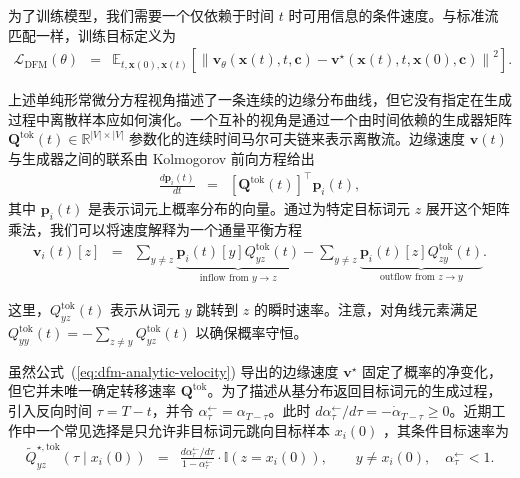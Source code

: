 为了训练模型，我们需要一个仅依赖于时间 $t$ 时可用信息的条件速度。与标准流匹配一样，训练目标定义为
\begin{eqnarray}
\mathcal{L}_{\text{DFM}}(\theta)
& = &
\mathbb{E}_{t, \mathbf{x}(0), \mathbf{x}(t)} \left[ \left\| \mathbf{v}_\theta(\mathbf{x}(t), t, \mathbf{c}) - \mathbf{v}^\star(\mathbf{x}(t), t, \mathbf{x}(0), \mathbf{c}) \right\|^2 \right].
\label{eq:dfm-objective}
\end{eqnarray}

上述单纯形常微分方程视角描述了一条连续的边缘分布曲线，但它没有指定在生成过程中离散样本应如何演化。一个互补的视角是通过一个由时间依赖的生成器矩阵 $\mathbf{Q}^{\mathrm{tok}}(t) \in \mathbb{R}^{|V| \times |V|}$ 参数化的连续时间马尔可夫链来表示离散流。边缘速度 $\mathbf{v}(t)$ 与生成器之间的联系由 Kolmogorov 前向方程给出
\begin{eqnarray}
\frac{d\mathbf{p}_i(t)}{dt} & = & \left[ \mathbf{Q}^{\mathrm{tok}}(t) \right]^\top \mathbf{p}_i(t),
\label{eq:kolmogorov-forward}
\end{eqnarray}
其中 $\mathbf{p}_i(t)$ 是表示词元上概率分布的向量。通过为特定目标词元 $z$ 展开这个矩阵乘法，我们可以将速度解释为一个通量平衡方程
\begin{eqnarray}
\mathbf{v}_i(t)[z]
& = &
\sum_{y \neq z} \underbrace{\mathbf{p}_i(t)[y] Q^{\mathrm{tok}}_{yz}(t)}_{\text{inflow from } y \to z}
-
\sum_{y \neq z} \underbrace{\mathbf{p}_i(t)[z] Q^{\mathrm{tok}}_{zy}(t)}_{\text{outflow from } z \to y}.
\label{eq:master-equation-Q}
\end{eqnarray}

\noindent 这里，$Q^{\mathrm{tok}}_{yz}(t)$ 表示从词元 $y$ 跳转到 $z$ 的瞬时速率。注意，对角线元素满足 $Q^{\mathrm{tok}}_{yy}(t) = - \sum_{z \neq y} Q^{\mathrm{tok}}_{yz}(t)$ 以确保概率守恒。

虽然公式~(\ref{eq:dfm-analytic-velocity}) 导出的边缘速度 $\mathbf{v}^\star$ 固定了概率的净变化，但它并未唯一确定转移速率 $\mathbf{Q}^{\mathrm{tok}}$。为了描述从基分布返回目标词元的生成过程，引入反向时间 $\tau=T-t$，并令 $\alpha^\leftarrow_\tau=\alpha_{T-\tau}$。此时 $d\alpha^\leftarrow_\tau/d\tau=-\dot{\alpha}_{T-\tau}\geq0$。近期工作中一个常见选择是只允许非目标词元跳向目标样本 $x_i(0)$ \citep{campbell-etal:2024generative}，其条件目标速率为
\begin{eqnarray}
\widetilde Q^{\star,\mathrm{tok}}_{yz}(\tau\mid x_i(0))
&=&
\frac{d\alpha^\leftarrow_\tau/d\tau}{1-\alpha^\leftarrow_\tau}
\cdot\mathbb{I}(z=x_i(0)),
\qquad y\ne x_i(0),\quad \alpha^\leftarrow_\tau<1.
\label{eq:target-Q}
\end{eqnarray}

